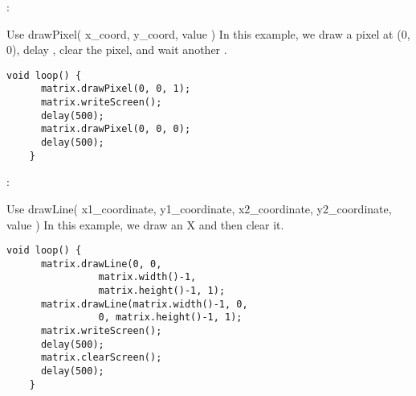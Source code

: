 \begin{minipage}[t]{0.49\tw}
  \vspace{0.0in}

  :
  \vspace{0.1in}

  Use drawPixel( x\_coord, y\_coord, value ) In this example, we draw a
  pixel at (0, 0), delay , clear the pixel, and wait another
  .

  \begin{Verbatim}[gobble=3,fontsize=\small]
    void loop() {
      matrix.drawPixel(0, 0, 1);
      matrix.writeScreen();
      delay(500);
      matrix.drawPixel(0, 0, 0);
      delay(500);
    }
  \end{Verbatim}

  :
  \vspace{0.1in}

  Use drawLine( x1\_coordinate, y1\_coordinate, x2\_coordinate,
  y2\_coordinate, value ) In this example, we draw an X and then clear
  it.

  \begin{Verbatim}[gobble=3,fontsize=\small]
    void loop() {
      matrix.drawLine(0, 0,
                matrix.width()-1,
                matrix.height()-1, 1);
      matrix.drawLine(matrix.width()-1, 0,
                0, matrix.height()-1, 1);
      matrix.writeScreen();
      delay(500);
      matrix.clearScreen();
      delay(500);
    }
  \end{Verbatim}
\end{minipage}
\hspace{0.1in}
